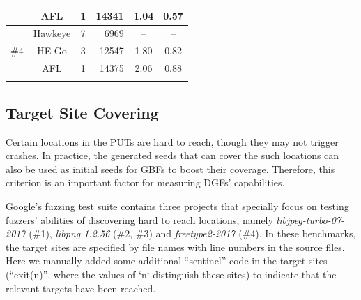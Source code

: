 \begin{table}[t]
\begin{tabular}{c|c|c|r|c|c}
        &      AFL   &        1                                              &                              14341                       &                    1.04                       &        0.57             \\ \hline
        \multirow{3}{*}{\#4} &  Hawkeye &                  7                                    &                6969                                     &                  --                 & --                             \\ \cline{2-6} 
        &      HE-Go  &       3                                               &                      12547                               &                 1.80                         &          0.82             \\ \cline{2-6} 
        &       AFL   &              1                                       &                  14375                                &             2.06                            &           0.88            \\ \thickhline
        
    \end{tabular}
\end{table} 


\subsection{Target Site Covering}\label{subsec:evalsrcloc}
Certain locations in the PUTs are hard to reach, though they may not trigger crashes.
In practice, the generated seeds that can cover the such locations can also be used as initial seeds for GBFs to boost their coverage. 
Therefore, this criterion is an important factor for measuring DGFs' capabilities. 

Google's fuzzing test suite contains three projects that specially focus on testing fuzzers' abilities of discovering hard to reach locations, namely \emph{libjpeg-turbo-07-2017} (\#1), \emph{libpng 1.2.56} (\#2, \#3) and \emph{freetype2-2017} (\#4). 
In these benchmarks, the target sites are specified by file names with line numbers in the source files. 
Here we manually added some additional ``sentinel'' code in the target sites (``exit(n)'', where the values of `n` distinguish these sites) to indicate that the relevant targets have been reached. 


